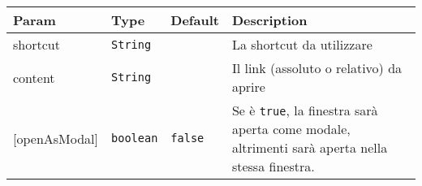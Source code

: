\begin{tabularx}{\textwidth}{XXXX}
\toprule
\begin{minipage}[b]{0.22\columnwidth}\raggedright
Param\strut
\end{minipage} & \begin{minipage}[b]{0.22\columnwidth}\raggedright
Type\strut
\end{minipage} & \begin{minipage}[b]{0.22\columnwidth}\raggedright
Default\strut
\end{minipage} & \begin{minipage}[b]{0.22\columnwidth}\raggedright
Description\strut
\end{minipage}\tabularnewline
\midrule
\endhead
\begin{minipage}[t]{0.22\columnwidth}\raggedright
shortcut\strut
\end{minipage} & \begin{minipage}[t]{0.22\columnwidth}\raggedright
\texttt{String}\strut
\end{minipage} & \begin{minipage}[t]{0.22\columnwidth}\raggedright
\strut
\end{minipage} & \begin{minipage}[t]{0.22\columnwidth}\raggedright
La shortcut da utilizzare\strut
\end{minipage}\tabularnewline
\begin{minipage}[t]{0.22\columnwidth}\raggedright
content\strut
\end{minipage} & \begin{minipage}[t]{0.22\columnwidth}\raggedright
\texttt{String}\strut
\end{minipage} & \begin{minipage}[t]{0.22\columnwidth}\raggedright
\strut
\end{minipage} & \begin{minipage}[t]{0.22\columnwidth}\raggedright
Il link (assoluto o relativo) da aprire\strut
\end{minipage}\tabularnewline
\begin{minipage}[t]{0.22\columnwidth}\raggedright
{[}openAsModal{]}\strut
\end{minipage} & \begin{minipage}[t]{0.22\columnwidth}\raggedright
\texttt{boolean}\strut
\end{minipage} & \begin{minipage}[t]{0.22\columnwidth}\raggedright
\texttt{false}\strut
\end{minipage} & \begin{minipage}[t]{0.22\columnwidth}\raggedright
Se è \texttt{true}, la finestra sarà aperta come modale, altrimenti sarà
aperta nella stessa finestra.\strut
\end{minipage}\tabularnewline
\bottomrule
\end{tabularx}

